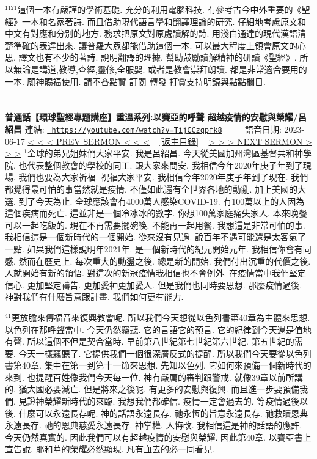 \documentclass{book}
\begin{document}
$^{1121}$這個一本有嚴謹的學術基礎.
充分的利用電腦科技.
有參考古今中外重要的《聖經》一本和名家著詩.
而且借助現代語言學和翻譯理論的研究.
仔細地考慮原文和中文有對應和分別的地方.
務求把原文對原處讀解的詩.
用淺白通達的現代漢語清楚準確的表達出來.
讓普羅大眾都能借助這個一本.
可以最大程度上領會原文的心思.
譯文也有不少的著詩.
說明翻譯的理據.
幫助鼓勵讀解精神的研讀《聖經》.
所以無論是講道,教導,查經,靈修,全服嬰.
或者是教會崇拜朗讀.
都是非常適合要用的一本.
願神賜福使用.
請不吝點贊 訂閱 轉發 打賞支持明鏡與點點欄目.
\newpage



\section{}
\label{sec:TijCCzqpfk8}
\textbf{普通話【環球聖經專題講座】重溫系列:以賽亞的呼聲 超越疫情的安慰與榮耀/呂紹昌}
\newline
\newline
連結: \href{https://youtube.com/watch?v=TijCCzqpfk8}{\texttt{ https://youtube.com/watch?v=TijCCzqpfk8}} ~~~~ 語音日期: 2023-06-17 
\newline
\newline
\hyperref[sec:HoZsRpmaJpU]{\small{< < < PREV SERMON < < <}}
~
\hyperref[sec:index]{\small{[返主目錄]}}
~
\hyperref[sec:NryoQVs7NC8]{\small{> > > NEXT SERMON > > >}}
\newline
\newline
$^{1}$全球的弟兄姐妹們大家平安.
我是呂紹昌.
今天從美國加州灣區基督共和神學院.
也代表整個教會的學校的同工.
跟大家來問安.
我相信今年2020年庚子年到了現場.
我們也要為大家祈福.
祝福大家平安.
我相信今年2020年庚子年到了現在.
我們都覺得最可怕的事當然就是疫情.
不僅如此還有全世界各地的動亂.
加上美國的大選.
到了今天為止.
全球應該會有4000萬人感染COVID-19.
有100萬以上的人因為這個疾病而死亡.
這並非是一個冷冰冰的數字.
你想100萬家庭痛失家人.
本來晚餐可以一起吃飯的.
現在不再需要擺碗筷.
不能再一起用餐.
我想這是非常可怕的事.
我相信這是一個新時代的一個開始.
從來沒有見過.
說百年不遇可能還是太客氣了一點.
如果我們這樣說明年2021年.
是一個新時代的紀元開始元年.
我相信你會有同感.
然而在歷史上.
每次重大的動盪之後.
總是新的開始.
我們付出沉重的代價之後.
人就開始有新的領悟.
對這次的新冠疫情我相信也不會例外.
在疫情當中我們堅定信心.
更加堅定禱告.
更加愛神更加愛人.
但是我們也同時要思想.
那麼疫情過後.
神對我們有什麼旨意跟計畫.
我們如何更有能力.

$^{41}$更放膽來傳福音來復興教會呢.
所以我們今天想從以色列書第40章為主體來思想.
以色列在那呼聲當中.
今天仍然竊聽.
它的言語它的預言.
它的紀律到今天還是值地有聲.
所以這個不但是契合當時.
早前第八世紀第七世紀第六世紀.
第五世紀的需要.
今天一樣竊聽了.
它提供我們一個很深層反式的提醒.
所以我們今天要從以色列書第40章.
集中在第一到第十一節來思想.
先知以色列.
它如何來預備一個新時代的來到.
也提醒百姓像我們今天每一位.
神有嚴厲的審判跟警戒.
就像39章以前所講的.
猶大國必要滅亡.
但是將來之後呢.
有更多的安慰與復興.
而且進一步要預備我們.
見證神榮耀新時代的來臨.
我想我們都確信.
疫情一定會過去的.
等疫情過後以後.
什麼可以永遠長存呢.
神的話語永遠長存.
祂永恆的旨意永遠長存.
祂救贖恩典永遠長存.
祂的恩典慈愛永遠長存.
神掌權.
人悔改.
我相信這是神的話語的應許.
今天仍然真實的.
因此我們可以有超越疫情的安慰與榮耀.
因此第40章.
以賽亞書上宣告說.
耶和華的榮耀必然顯現.
凡有血去的必一同看見.
\end{document}
